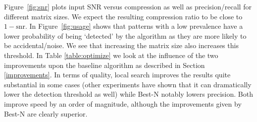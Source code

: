 \documentclass{llncs}
\begin{document}
Figure~\ref{fig:snr} plots input SNR versus compression as well as precision/recall for different matrix sizes. We expect the resulting compression ratio to be close to $1-\mathrm{snr}$. In Figure~\ref{fig:usage} shows that patterns with a low prevalence have a lower probability of being `detected' by the algorithm as they are more likely to be accidental/noise. We see that increasing the matrix size also increases this threshold. In Table \ref{table:optimize} we look at the influence of the two improvements upon the baseline algorithm as described in Section \ref{improvements}. In terms of quality, local search improves the results quite substantial in some cases (other experiments have shown that it can dramatically lower the detection threshold as well) while Best-N notably lowers precision. Both improve speed by an order of magnitude, although the improvements given by Best-N are clearly superior. %
\end{document}
